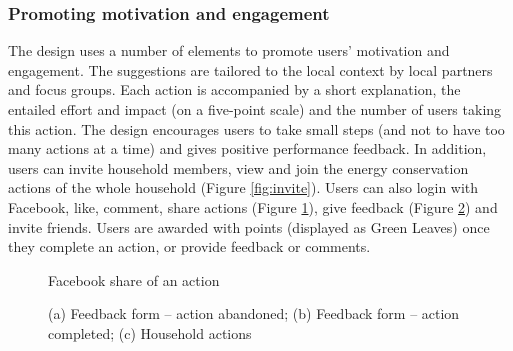 \subsubsection{Promoting motivation and engagement} 
The design uses a number of elements to promote users' motivation and engagement. 
The suggestions are tailored to the local context by local partners and focus groups. 
Each action is accompanied by a short explanation, the entailed effort and impact (on a five-point scale) and the number of users taking this action. 
The design encourages users to take small steps (and not to have too many actions at a time) and gives positive performance feedback. 
In addition, users can invite household members, view and join the energy conservation actions of the whole household (Figure \ref{fig:invite}).
Users can also login with Facebook, like, comment, share actions (Figure \ref{fig:share}), give feedback (Figure \ref{fig:form}) and invite friends. Users are awarded with points  (displayed as Green Leaves) once they complete an action, or provide feedback or comments. 




\begin{figure}
\centering
{}
\caption{Facebook share of an action}
\label{fig:share}
\end{figure}

\begin{figure}[t!]
      \begin{center}
        \begin{minipage}[t!]{0.33\linewidth}
        \end{minipage}
        \begin{minipage}[t!]{0.31\linewidth}
                \end{minipage}
        \begin{minipage}[t!]{0.33\linewidth}    
        \end{minipage}
      \end{center}
      \caption{(a) Feedback form -- action abandoned; (b) Feedback form -- action completed; (c) Household actions}\label{fig:form}
\end{figure}

